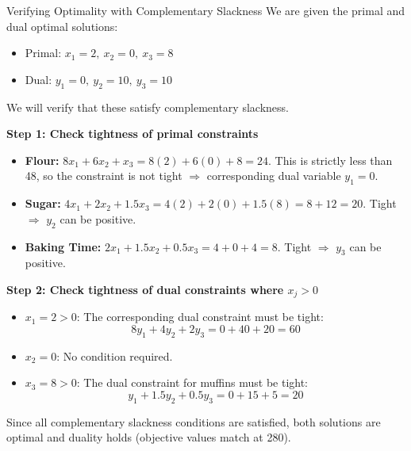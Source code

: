 \begin{example}{Verifying Optimality with Complementary Slackness}{}
We are given the primal and dual optimal solutions:

\begin{itemize}
\item Primal: \( x_1 = 2,\ x_2 = 0,\ x_3 = 8 \)
\item Dual: \( y_1 = 0,\ y_2 = 10,\ y_3 = 10 \)
\end{itemize}

We will verify that these satisfy complementary slackness.

\textbf{Step 1: Check tightness of primal constraints}

\begin{itemize}
\item \textbf{Flour: } \( 8x_1 + 6x_2 + x_3 = 8(2) + 6(0) + 8 = 24 \). This is strictly less than 48, so the constraint is not tight \(\Rightarrow\) corresponding dual variable \(y_1 = 0\).
\item \textbf{Sugar: } \( 4x_1 + 2x_2 + 1.5x_3 = 4(2) + 2(0) + 1.5(8) = 8 + 12 = 20 \). Tight \(\Rightarrow\) \(y_2\) can be positive.
\item \textbf{Baking Time: } \( 2x_1 + 1.5x_2 + 0.5x_3 = 4 + 0 + 4 = 8 \). Tight \(\Rightarrow\) \(y_3\) can be positive.
\end{itemize}

\textbf{Step 2: Check tightness of dual constraints where \(x_j > 0\)}

\begin{itemize}
\item \(x_1 = 2 > 0\): The corresponding dual constraint must be tight:
\[
8y_1 + 4y_2 + 2y_3 = 0 + 40 + 20 = 60
\]
\item \(x_2 = 0\): No condition required.
\item \(x_3 = 8 > 0\): The dual constraint for muffins must be tight:
\[
y_1 + 1.5y_2 + 0.5y_3 = 0 + 15 + 5 = 20
\]
\end{itemize}

Since all complementary slackness conditions are satisfied, both solutions are optimal and duality holds (objective values match at 280).
\end{example}

